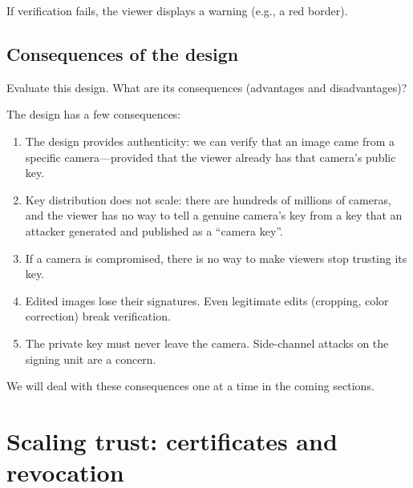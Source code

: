 If verification fails, the viewer displays a warning (e.g., a red border).

\subsection{Consequences of the design}\label{CameraConsequencesFirst}

\begin{exercise}
  Evaluate this design.
  What are its consequences (advantages and disadvantages)?
\end{exercise}

The design has a few consequences:
\begin{enumerate}
  \item The design provides authenticity: we can verify that an image came
    from a specific camera---provided that the viewer already has that
    camera's public key.
  \item Key distribution does not scale: there are hundreds of millions of
    cameras, and the viewer has no way to tell a genuine camera's key from
    a key that an attacker generated and published as a
    \enquote{camera key}.
  \item If a camera is compromised, there is no way to make viewers stop
    trusting its key.
  \item Edited images lose their signatures.
    Even legitimate edits (cropping, color correction) break verification.
  \item The private key must never leave the camera.
    Side-channel attacks on the signing unit are a concern.
\end{enumerate}

We will deal with these consequences one at a time in the coming sections.


\section{Scaling trust: certificates and
revocation}\label{CameraKeyManagement}


